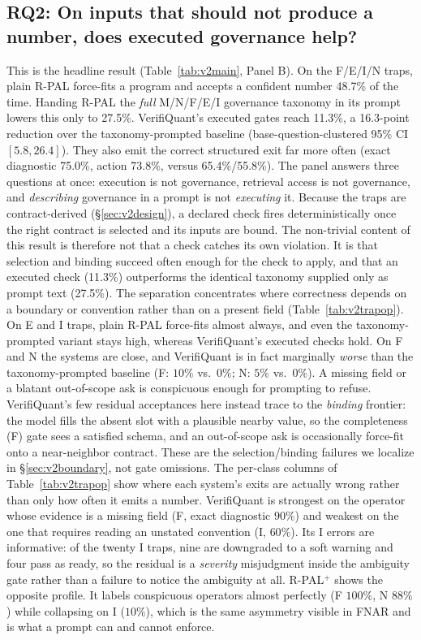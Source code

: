 \documentclass[sigconf,anonymous]{acmart}
\newcommand{\govVQfnar}{11.3\%}           %
\newcommand{\govPromptFnar}{27.5\%}       %
\newcommand{\govPlainFnar}{48.7\%}        %
\newcommand{\govGap}{16.3}                %
\newcommand{\govCIlo}{5.8}                %
\newcommand{\govCIhi}{26.4}               %
\newcommand{\govVQdiag}{75.0\%}
\newcommand{\govVQaction}{73.8\%}
\newcommand{\govPromptDiag}{65.4\%}
\newcommand{\govPromptAction}{55.8\%}
\begin{document}
\subsection{RQ2: On inputs that should not produce a number, does executed governance help?}
This is the headline result (Table~\ref{tab:v2main}, Panel B).
On the F/E/I/N traps, plain R-PAL force-fits a program and accepts a confident number \govPlainFnar{} of the time.
Handing R-PAL the \emph{full} M/N/F/E/I governance taxonomy in its prompt lowers this only to \govPromptFnar{}.
VerifiQuant's executed gates reach \govVQfnar{}, a \govGap{}-point reduction over the taxonomy-prompted baseline (base-question-clustered 95\% CI $[\govCIlo{},\govCIhi{}]$). They also emit the correct structured exit far more often (exact diagnostic \govVQdiag{}, action \govVQaction{}, versus \govPromptDiag{}/\govPromptAction{}).
The panel answers three questions at once: execution is not governance, retrieval access is not governance, and \emph{describing} governance in a prompt is not \emph{executing} it.
Because the traps are contract-derived (\S\ref{sec:v2design}), a declared check fires deterministically once the right contract is selected and its inputs are bound. The non-trivial content of this result is therefore not that a check catches its own violation. It is that selection and binding succeed often enough for the check to apply, and that an executed check (\govVQfnar{}) outperforms the identical taxonomy supplied only as prompt text (\govPromptFnar{}).
The separation concentrates where correctness depends on a boundary or convention rather than on a present field (Table~\ref{tab:v2trapop}). On E and I traps, plain R-PAL force-fits almost always, and even the taxonomy-prompted variant stays high, whereas VerifiQuant's executed checks hold.
On F and N the systems are close, and VerifiQuant is in fact marginally \emph{worse} than the taxonomy-prompted baseline (F: $10\%$ vs.\ $0\%$; N: $5\%$ vs.\ $0\%$). A missing field or a blatant out-of-scope ask is conspicuous enough for prompting to refuse. VerifiQuant's few residual acceptances here instead trace to the \emph{binding} frontier: the model fills the absent slot with a plausible nearby value, so the completeness (F) gate sees a satisfied schema, and an out-of-scope ask is occasionally force-fit onto a near-neighbor contract.
These are the selection/binding failures we localize in \S\ref{sec:v2boundary}, not gate omissions.
The per-class columns of Table~\ref{tab:v2trapop} show where each system's exits are actually wrong rather than only how often it emits a number. VerifiQuant is strongest on the operator whose evidence is a missing field (F, exact diagnostic $90\%$) and weakest on the one that requires reading an unstated convention (I, $60\%$). Its I errors are informative: of the twenty I traps, nine are downgraded to a soft warning and four pass as ready, so the residual is a \emph{severity} misjudgment inside the ambiguity gate rather than a failure to notice the ambiguity at all. R-PAL$^{+}$ shows the opposite profile. It labels conspicuous operators almost perfectly (F $100\%$, N $88\%$) while collapsing on I ($10\%$), which is the same asymmetry visible in FNAR and is what a prompt can and cannot enforce.
\end{document}
